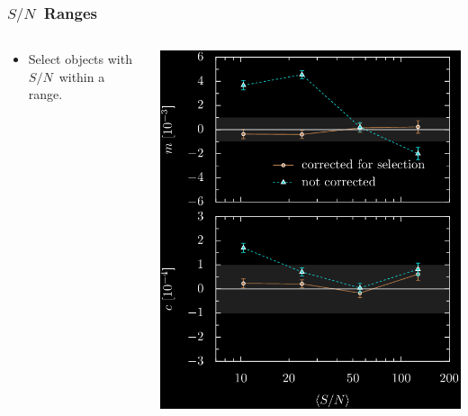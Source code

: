 \documentclass{beamer}
\newcommand{\snr}{$S/N$}
\begin{document}
\frame
{
    \frametitle{\snr\ Ranges}
 

    \begin{columns}
        \begin{column}{0.4\textwidth}
            \begin{itemize}
                \item Select objects with \snr\ within a range.
            \end{itemize}
        \end{column}
        \begin{column}{0.6\textwidth}
            \begin{center}
            \includegraphics[width=\textwidth]{mc-select-bias-range-pyx-inv.png}
                \newline
            \end{center}
        \end{column}
    \end{columns}


}
\end{document}
